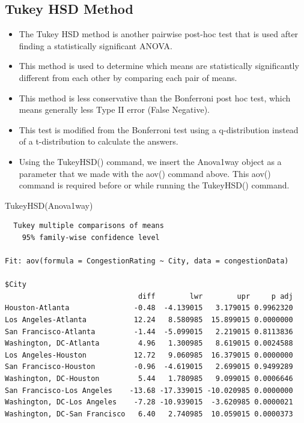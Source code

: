 \documentclass[
  letterpaper,
  DIV=11,
  numbers=noendperiod]{scrreprt}
\newenvironment{Shaded}{\begin{snugshade}}{\end{snugshade}}
\newcommand{\FunctionTok}[1]{\textcolor[rgb]{0.28,0.35,0.67}{#1}}
\newcommand{\NormalTok}[1]{\textcolor[rgb]{0.00,0.23,0.31}{#1}}
\providecommand{\tightlist}{%
  \setlength{\itemsep}{0pt}\setlength{\parskip}{0pt}}\usepackage{longtable,booktabs,array}
\begin{document}
\subsection{Tukey HSD Method}\label{tukey-hsd-method}

\begin{itemize}
\tightlist
\item
  The Tukey HSD method is another pairwise post-hoc test that is used
  after finding a statistically significant ANOVA.
\item
  This method is used to determine which means are statistically
  significantly different from each other by comparing each pair of
  means.
\item
  This method is less conservative than the Bonferroni post hoc test,
  which means generally less Type II error (False Negative).
\item
  This test is modified from the Bonferroni test using a q-distribution
  instead of a t-distribution to calculate the answers.
\item
  Using the TukeyHSD() command, we insert the Anova1way object as a
  parameter that we made with the aov() command above. This aov()
  command is required before or while running the TukeyHSD() command.
\end{itemize}

\begin{Shaded}
\begin{Highlighting}[]
\FunctionTok{TukeyHSD}\NormalTok{(Anova1way)}
\end{Highlighting}
\end{Shaded}

\begin{verbatim}
  Tukey multiple comparisons of means
    95% family-wise confidence level

Fit: aov(formula = CongestionRating ~ City, data = congestionData)

$City
                               diff        lwr        upr     p adj
Houston-Atlanta               -0.48  -4.139015   3.179015 0.9962320
Los Angeles-Atlanta           12.24   8.580985  15.899015 0.0000000
San Francisco-Atlanta         -1.44  -5.099015   2.219015 0.8113836
Washington, DC-Atlanta         4.96   1.300985   8.619015 0.0024588
Los Angeles-Houston           12.72   9.060985  16.379015 0.0000000
San Francisco-Houston         -0.96  -4.619015   2.699015 0.9499289
Washington, DC-Houston         5.44   1.780985   9.099015 0.0006646
San Francisco-Los Angeles    -13.68 -17.339015 -10.020985 0.0000000
Washington, DC-Los Angeles    -7.28 -10.939015  -3.620985 0.0000021
Washington, DC-San Francisco   6.40   2.740985  10.059015 0.0000373
\end{verbatim}
\end{document}
